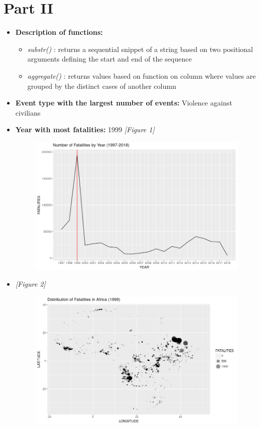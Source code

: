 \documentclass[a4paper, fleqn]{article}
\begin{document}
\section{Part II}
\begin{itemize}
\item \textbf{Description of functions: }\begin{itemize}
\item \textit{substr()} : returns a sequential snippet of a string based on two positional arguments defining the start and end of the sequence
\item \textit{aggregate()} : returns values based on function on column where values are grouped by the distinct cases of another column
\end{itemize}
\item \textbf{Event type with the largest number of events: }Violence against civilians 
\item \textbf{Year with most fatalities: } 1999 \textit{[Figure 1]}
\begin{figure}[h!]
\includegraphics[width=\linewidth]{./assets/201803220315.png}
\label{figure:img1}
\end{figure}
\item \textit{[Figure 2]}\\\begin{figure}[h!]
\includegraphics[width=\linewidth]{./assets/201803220342.png}

\end{figure}
\end{itemize}
\end{document}
